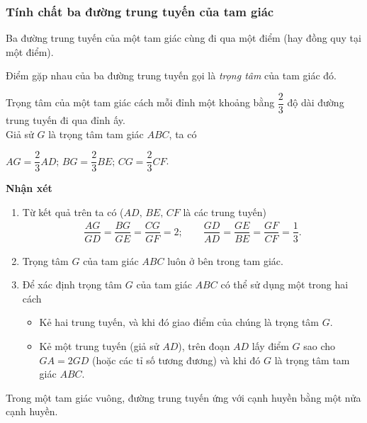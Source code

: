 \subsubsection{Tính chất ba đường trung tuyến của tam giác}
\begin{tc} Ba đường trung tuyến của một tam giác cùng đi qua một điểm (hay đồng quy tại một điểm).
	\end{tc}
\begin{tc} Điểm gặp nhau của ba đường trung tuyến gọi là \textit{trọng tâm} của tam giác đó.
\end{tc}
\begin{tc}
	\immini
	 {Trọng tâm của một tam giác cách mỗi đỉnh một khoảng bằng $\dfrac{2}{3}$ độ dài đường trung tuyến đi qua đỉnh ấy.\\
Giả sử $G$ là trọng tâm tam giác $ABC$, ta có
\begin{flushleft}
	$AG=\dfrac{2}{3}AD;\,BG=\dfrac{2}{3}BE;\,CG=\dfrac{2}{3}CF$.
\end{flushleft}}
{}
\end{tc}
\textbf{Nhận xét}
\begin{enumerate}
	\item Từ kết quả trên ta có ($AD,\,BE,\,CF$ là các trung tuyến)
	\begin{align*}
		\dfrac{AG}{GD}=\dfrac{BG}{GE}=\dfrac{CG}{GF}=2;\quad \quad \dfrac{GD}{AD}=\dfrac{GE}{BE}=\dfrac{GF}{CF}=\dfrac{1}{3}.
\end{align*}
\item Trọng tâm $G$ của tam giác $ABC$ luôn ở bên trong tam giác.
\item Để xác định trọng tâm $G$ của tam giác $ABC$ có thể sử dụng một trong hai cách
\begin{itemize}
	\item Kẻ hai trung tuyến, và khi đó giao điểm của chúng là trọng tâm $G$.
	\item Kẻ một trung tuyến (giả sử $AD$), trên đoạn $AD$ lấy điểm $G$ sao cho $GA=2GD$ (hoặc các tỉ số tương đương) và khi đó $G$ là trọng tâm tam giác $ABC$.
\end{itemize}
\end{enumerate}
\begin{note}
Trong một tam giác vuông, đường trung tuyến ứng với cạnh huyền bằng một nửa cạnh huyền.
\end{note}

